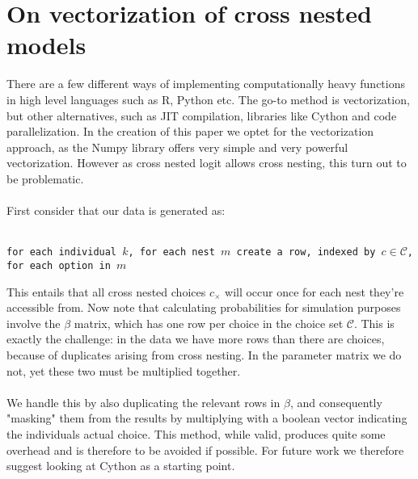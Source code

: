 
\FloatBarrier
\section{On vectorization of cross nested models}
\label{app: vectorization}

There are a few different ways of implementing computationally heavy functions in high level languages such as R, Python etc. The go-to method is vectorization, but other alternatives, such as JIT compilation, libraries like Cython and code parallelization. In the creation of this paper we optet for the vectorization approach, as the Numpy library offers very simple and very powerful vectorization. However as cross nested logit allows cross nesting, this turn out to be problematic.
\\ \\
First consider that our data is generated as:
\\ \\
\begin{minipage}[t]{0.8\textwidth}
\texttt{for each individual $k$, for each nest $m$ create a row, indexed by $c\in \mathcal{C}$, for each option in $m$}
\end{minipage}
\vspace{0.8cm}

This entails that all cross nested choices $c_{\times}$ will occur once for each nest they're accessible from. Now note that calculating probabilities for simulation purposes involve the $\beta$ matrix, which has one row per choice in the choice set $\mathcal{C}$. This is exactly the challenge: in the data we have more rows than there are choices, because of duplicates arising from cross nesting. In the parameter matrix we do not, yet these two must be multiplied together.
\\ \\
We handle this by also duplicating the relevant rows in $\beta$, and consequently "masking" them from the results by multiplying with a boolean vector indicating the individuals actual choice. This method, while valid, produces quite some overhead and is therefore to be avoided if possible. For future work we therefore suggest looking at Cython as a starting point.
